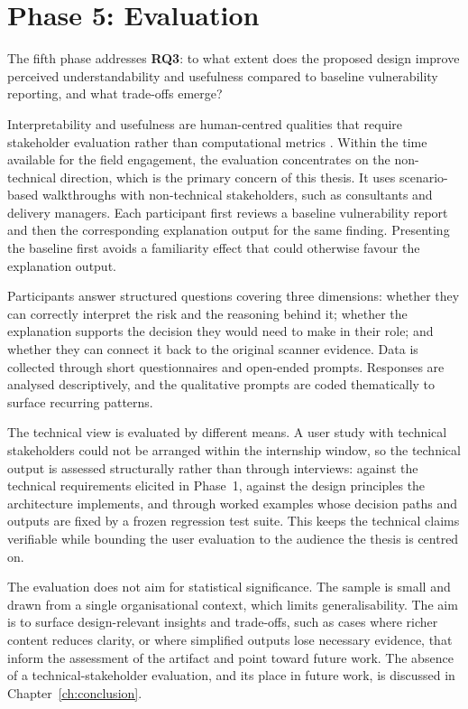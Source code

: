 \section{Phase 5: Evaluation}
\label{sec:methods-phase5}

The fifth phase addresses \textbf{RQ3}: to what extent does the proposed design improve perceived understandability and usefulness compared to baseline vulnerability reporting, and what trade-offs emerge?

Interpretability and usefulness are human-centred qualities that require stakeholder evaluation rather than computational metrics \cite{doshivelez2017rigorous, miller2019explanation}. Within the time available for the field engagement, the evaluation concentrates on the non-technical direction, which is the primary concern of this thesis. It uses scenario-based walkthroughs with non-technical stakeholders, such as consultants and delivery managers. Each participant first reviews a baseline vulnerability report and then the corresponding explanation output for the same finding. Presenting the baseline first avoids a familiarity effect that could otherwise favour the explanation output.

Participants answer structured questions covering three dimensions: whether they can correctly interpret the risk and the reasoning behind it; whether the explanation supports the decision they would need to make in their role; and whether they can connect it back to the original scanner evidence. Data is collected through short questionnaires and open-ended prompts. Responses are analysed descriptively, and the qualitative prompts are coded thematically to surface recurring patterns.

The technical view is evaluated by different means. A user study with technical stakeholders could not be arranged within the internship window, so the technical output is assessed structurally rather than through interviews: against the technical requirements elicited in Phase~1, against the design principles the architecture implements, and through worked examples whose decision paths and outputs are fixed by a frozen regression test suite. This keeps the technical claims verifiable while bounding the user evaluation to the audience the thesis is centred on.

The evaluation does not aim for statistical significance. The sample is small and drawn from a single organisational context, which limits generalisability. The aim is to surface design-relevant insights and trade-offs, such as cases where richer content reduces clarity, or where simplified outputs lose necessary evidence, that inform the assessment of the artifact and point toward future work. The absence of a technical-stakeholder evaluation, and its place in future work, is discussed in Chapter~\ref{ch:conclusion}.